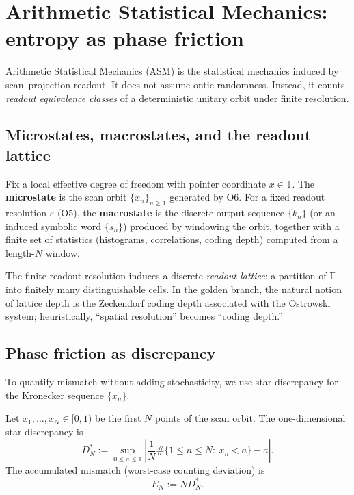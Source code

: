 \section{Arithmetic Statistical Mechanics: entropy as phase friction}
\label{sec:asm}

Arithmetic Statistical Mechanics (ASM) is the statistical mechanics induced by scan--projection readout. It does not assume ontic randomness. Instead, it counts \emph{readout equivalence classes} of a deterministic unitary orbit under finite resolution.

\subsection{Microstates, macrostates, and the readout lattice}

\begin{definition}
Fix a local effective degree of freedom with pointer coordinate $x\in\mathbb{T}$. The \textbf{microstate} is the scan orbit $\{x_n\}_{n\ge 1}$ generated by O6. For a fixed readout resolution $\varepsilon$ (O5), the \textbf{macrostate} is the discrete output sequence $\{k_n\}$ (or an induced symbolic word $\{s_n\}$) produced by windowing the orbit, together with a finite set of statistics (histograms, correlations, coding depth) computed from a length-$N$ window.
\end{definition}

\noindent The finite readout resolution induces a discrete \emph{readout lattice}: a partition of $\mathbb{T}$ into finitely many distinguishable cells. In the golden branch, the natural notion of lattice depth is the Zeckendorf coding depth associated with the Ostrowski system; heuristically, ``spatial resolution'' becomes ``coding depth.''

\subsection{Phase friction as discrepancy}

To quantify mismatch without adding stochasticity, we use star discrepancy for the Kronecker sequence $\{x_n\}$.

\begin{definition}
Let $x_1,\dots,x_N\in[0,1)$ be the first $N$ points of the scan orbit. The one-dimensional star discrepancy is
\begin{equation}
D_N^\ast := \sup_{0\le a\le 1}\left|\frac{1}{N}\#\{1\le n\le N:\ x_n<a\}-a\right|.
\end{equation}
The accumulated mismatch (worst-case counting deviation) is
\begin{equation}
E_N := N D_N^\ast.
\end{equation}
\end{definition}

